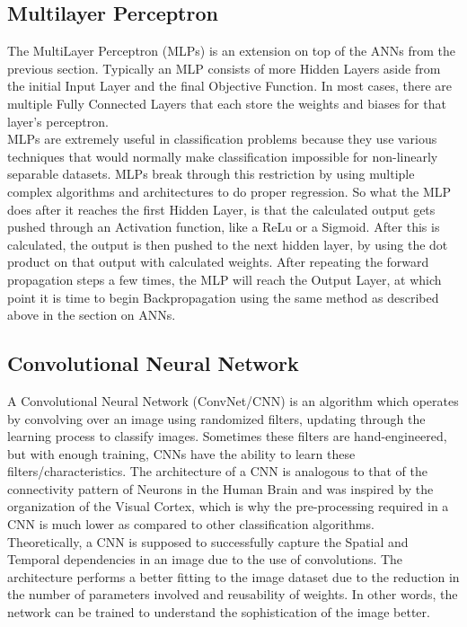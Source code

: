 \subsection{Multilayer Perceptron}
\label{sec:methods:Multilayer Perceptron}

The MultiLayer Perceptron (MLPs) is an extension on top of the ANNs from the previous section. Typically an MLP consists of more Hidden Layers aside from the initial Input Layer and the final Objective Function. In most cases, there are multiple Fully Connected Layers that each store the weights and biases for that layer's perceptron.\\

\noindent MLPs are extremely useful in classification problems because they use various techniques that would normally make classification impossible for non-linearly separable datasets. MLPs break through this restriction by using multiple complex algorithms and architectures to do proper regression. So what the MLP does after it reaches the first Hidden Layer, is that the calculated output gets pushed through an Activation function, like a ReLu or a Sigmoid. After this is calculated, the output is then pushed to the next hidden layer, by using the dot product on that output with calculated weights. After repeating the forward propagation steps a few times, the MLP will reach the Output Layer, at which point it is time to begin Backpropagation using the same method as described above in the section on ANNs.
\subsection{Convolutional Neural Network}
\label{sec:methods:Convolutional Neural Network}

A Convolutional Neural Network (ConvNet/CNN) is an algorithm which operates by convolving over an image using randomized filters, updating through the learning process to classify images. Sometimes these filters are hand-engineered, but with enough training, CNNs have the ability to learn these filters/characteristics. The architecture of a CNN is analogous to that of the connectivity pattern of Neurons in the Human Brain and was inspired by the organization of the Visual Cortex, which is why the pre-processing required in a CNN is much lower as compared to other classification algorithms. \cite{hussain_2020}\\

\noindent Theoretically, a CNN is supposed to successfully capture the Spatial and Temporal dependencies in an image due to the use of convolutions. The architecture performs a better fitting to the image dataset due to the reduction in the number of parameters involved and reusability of weights. In other words, the network can be trained to understand the sophistication of the image better. \cite{hussain_2020}\\


